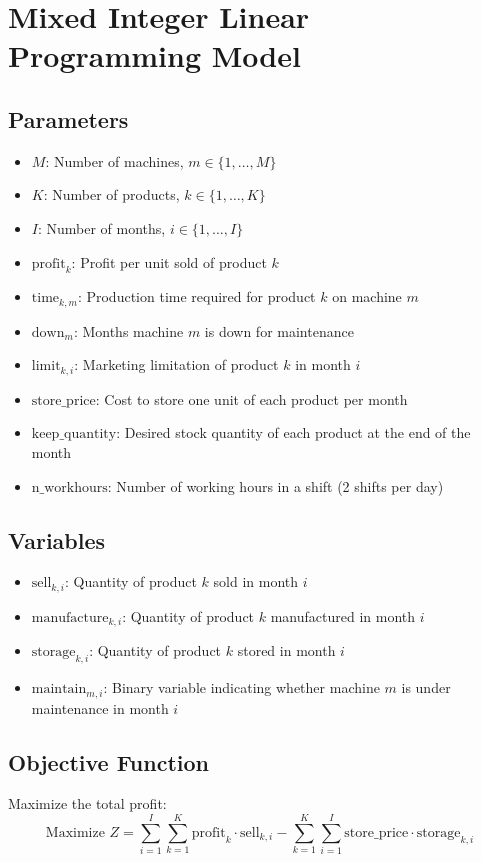 \documentclass{article}
\begin{document}
\section*{Mixed Integer Linear Programming Model}

\subsection*{Parameters}
\begin{itemize}
    \item $M$: Number of machines, $m \in \{1, \ldots, M\}$
    \item $K$: Number of products, $k \in \{1, \ldots, K\}$
    \item $I$: Number of months, $i \in \{1, \ldots, I\}$
    \item $\text{profit}_k$: Profit per unit sold of product $k$
    \item $\text{time}_{k,m}$: Production time required for product $k$ on machine $m$
    \item $\text{down}_m$: Months machine $m$ is down for maintenance
    \item $\text{limit}_{k,i}$: Marketing limitation of product $k$ in month $i$
    \item $\text{store\_price}$: Cost to store one unit of each product per month
    \item $\text{keep\_quantity}$: Desired stock quantity of each product at the end of the month
    \item $\text{n\_workhours}$: Number of working hours in a shift (2 shifts per day)
\end{itemize}

\subsection*{Variables}
\begin{itemize}
    \item $\text{sell}_{k,i}$: Quantity of product $k$ sold in month $i$
    \item $\text{manufacture}_{k,i}$: Quantity of product $k$ manufactured in month $i$
    \item $\text{storage}_{k,i}$: Quantity of product $k$ stored in month $i$
    \item $\text{maintain}_{m,i}$: Binary variable indicating whether machine $m$ is under maintenance in month $i$
\end{itemize}

\subsection*{Objective Function}
Maximize the total profit:
\[
\text{Maximize } Z = \sum_{i=1}^{I} \sum_{k=1}^{K} \text{profit}_k \cdot \text{sell}_{k,i} - \sum_{k=1}^{K} \sum_{i=1}^{I} \text{store\_price} \cdot \text{storage}_{k,i}
\]
\end{document}
